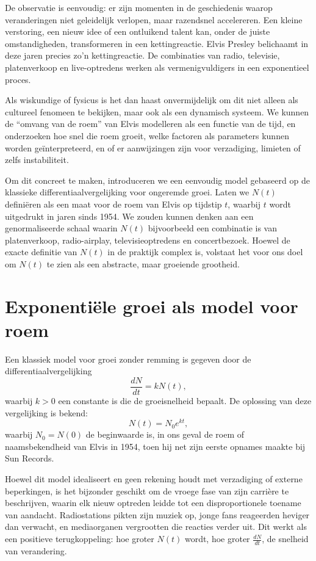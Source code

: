 \documentclass{book}
\begin{document}
	De observatie is eenvoudig: er zijn momenten in de geschiedenis waarop veranderingen niet
	geleidelijk verlopen, maar razendsnel accelereren. Een kleine verstoring, een nieuw idee of een
	ontluikend talent kan, onder de juiste omstandigheden, transformeren in een kettingreactie.
	Elvis Presley belichaamt in deze jaren precies zo'n kettingreactie. De combinaties van radio,
	televisie, platenverkoop en live-optredens werken als vermenigvuldigers in een
	exponentieel proces.
	
	Als wiskundige of fysicus is het dan haast onvermijdelijk om dit niet alleen als
	cultureel fenomeen te bekijken, maar ook als een dynamisch systeem. We kunnen de ``omvang van de roem''
	van Elvis modelleren als een functie van de tijd, en onderzoeken hoe snel die roem groeit, welke factoren
	als parameters kunnen worden ge\"interpreteerd, en of er aanwijzingen zijn voor verzadiging, limieten of
	zelfs instabiliteit.
	
	Om dit concreet te maken, introduceren we een eenvoudig model gebaseerd op de
	klassieke differentiaalvergelijking voor ongeremde groei. Laten we $N(t)$ defini\"eren als een maat voor de
	roem van Elvis op tijdstip $t$, waarbij $t$ wordt uitgedrukt in jaren sinds 1954. We zouden kunnen denken
	aan een genormaliseerde schaal waarin $N(t)$ bijvoorbeeld een combinatie is van platenverkoop, radio-airplay,
	televisieoptredens en concertbezoek. Hoewel de exacte definitie van $N(t)$ in de praktijk complex is, volstaat
	het voor ons doel om $N(t)$ te zien als een abstracte, maar groeiende grootheid.
	
	\section{Exponenti\"ele groei als model voor roem}
	
	Een klassiek model voor groei zonder remming is gegeven door de differentiaalvergelijking
	\[
	\frac{dN}{dt} = k N(t),
	\]
	waarbij $k > 0$ een constante is die de groeisnelheid bepaalt. De oplossing van deze vergelijking is
	bekend:
	\[
	N(t) = N_0 e^{kt},
	\]
	waarbij $N_0 = N(0)$ de beginwaarde is, in ons geval de roem of naamsbekendheid van Elvis in 1954, toen hij
	net zijn eerste opnames maakte bij Sun Records.
	
	Hoewel dit model idealiseert en geen rekening houdt met verzadiging of externe beperkingen, is het bijzonder
	geschikt om de vroege fase van zijn carri\`ere te beschrijven, waarin elk nieuw optreden leidde tot een disproportionele
	toename van aandacht. Radiostations pikten zijn muziek op, jonge fans reageerden heviger dan verwacht, en mediaorganen
	vergrootten die reacties verder uit. Dit werkt als een positieve terugkoppeling: hoe groter $N(t)$ wordt, hoe groter
	\(\frac{dN}{dt}\), de snelheid van verandering.
	
\end{document}
